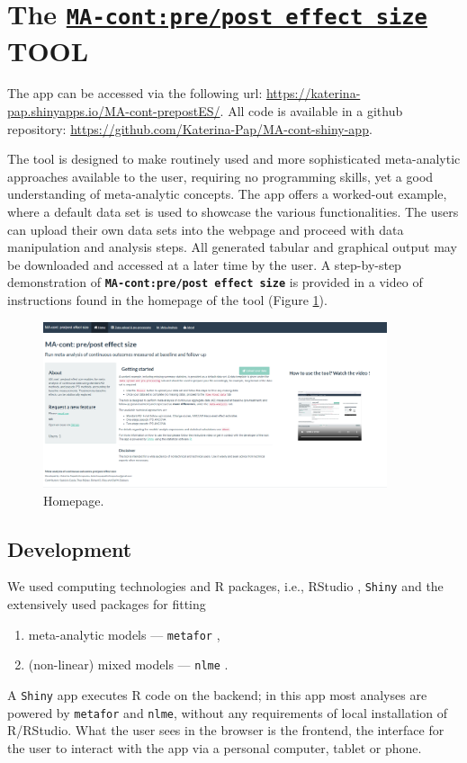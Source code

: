 \documentclass[AMA,STIX1COL]{WileyNJD-v2}
\begin{document}
\section{The \href{https://katerina-pap.shinyapps.io/MA-cont-prepostES/}{\textbf{\texttt{MA-cont:pre/post effect size}}} TOOL}

The app can be accessed via the following url: \url{https://katerina-pap.shinyapps.io/MA-cont-prepostES/}. All code is available in a github repository: \url{https://github.com/Katerina-Pap/MA-cont-shiny-app}.

The tool is designed to make routinely used and more sophisticated meta-analytic approaches available to the user, requiring no programming skills, yet a good understanding of meta-analytic concepts. The app offers a worked-out example, where a default data set is used to showcase the various functionalities. The users can upload their own data sets into the webpage and proceed with data manipulation and analysis steps. All generated tabular and graphical output may be downloaded and accessed at a later time by the user.  A step-by-step demonstration of \textbf{\texttt{MA-cont:pre/post effect size}} is provided in a video of instructions found in the homepage of the tool (Figure \ref{shiny-homepage}).

\begin{figure}[t]
   \centering \includegraphics[width=0.9\textwidth]{Home page_shiny.jpeg}
    \caption{\small {Homepage.}}\label{shiny-homepage}
\end{figure}

\newpage
\subsection{Development}

We used computing technologies and R packages, i.e., RStudio \citep{Rstudiocite}, \texttt{Shiny} \citep{chang2017shiny} and the extensively used packages for fitting
\begin{enumerate}
    \item meta-analytic models — \texttt{metafor} \citep{viechtbauer2010conducting},
    \item (non-linear) mixed models — \texttt{nlme} \citep{pinheiro2017package}.
\end{enumerate}
A \texttt{Shiny} app executes R code on the backend; in this app most analyses are powered by \texttt{metafor} and \texttt{nlme}, without any requirements of local installation of R/RStudio. What the user sees in the browser is the frontend, the interface for the user to interact with the app via a personal computer, tablet or phone.
\end{document}
